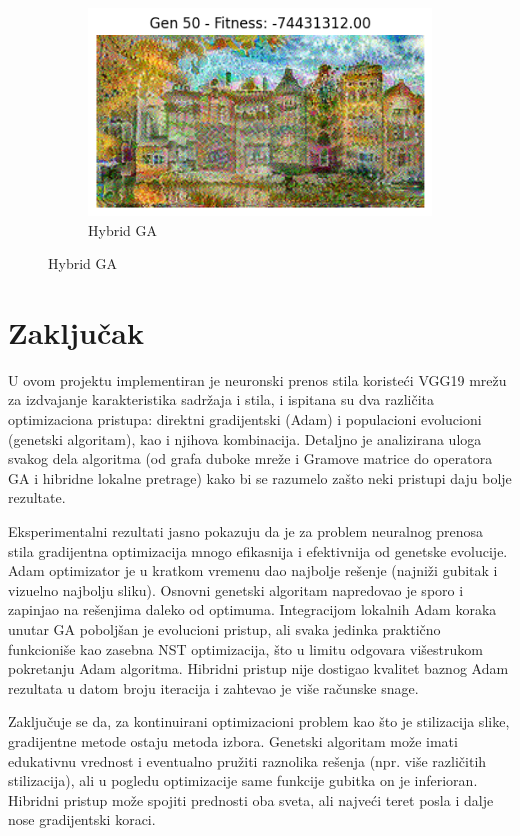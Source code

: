\documentclass[a4paper,12pt]{article}
\begin{document}
\begin{figure}[H]
\begin{subfigure}{0.4\textwidth}
    \includegraphics[width=\linewidth]{ams_ga.png}
    \caption{Hybrid GA}
\end{subfigure}
\end{figure}

\newpage

\section{Zaključak}
U ovom projektu implementiran je neuronski prenos stila koristeći VGG19 mrežu za izdvajanje karakteristika sadržaja i stila, i ispitana su dva različita optimizaciona pristupa: direktni gradijentski (Adam) i populacioni evolucioni (genetski algoritam), kao i njihova kombinacija. Detaljno je analizirana uloga svakog dela algoritma (od grafa duboke mreže i Gramove matrice do operatora GA i hibridne lokalne pretrage) kako bi se razumelo zašto neki pristupi daju bolje rezultate.

Eksperimentalni rezultati jasno pokazuju da je za problem neuralnog prenosa stila gradijentna optimizacija mnogo efikasnija i efektivnija od genetske evolucije. Adam optimizator je u kratkom vremenu dao najbolje rešenje (najniži gubitak i vizuelno najbolju sliku). Osnovni genetski algoritam napredovao je sporo i zapinjao na rešenjima daleko od optimuma. Integracijom lokalnih Adam koraka unutar GA poboljšan je evolucioni pristup, ali svaka jedinka praktično funkcioniše kao zasebna NST optimizacija, što u limitu odgovara višestrukom pokretanju Adam algoritma. Hibridni pristup nije dostigao kvalitet baznog Adam rezultata u datom broju iteracija i zahtevao je više računske snage.

Zaključuje se da, za kontinuirani optimizacioni problem kao što je stilizacija slike, gradijentne metode ostaju metoda izbora. Genetski algoritam može imati edukativnu vrednost i eventualno pružiti raznolika rešenja (npr. više različitih stilizacija), ali u pogledu optimizacije same funkcije gubitka on je inferioran. Hibridni pristup može spojiti prednosti oba sveta, ali najveći teret posla i dalje nose gradijentski koraci.
\end{document}
